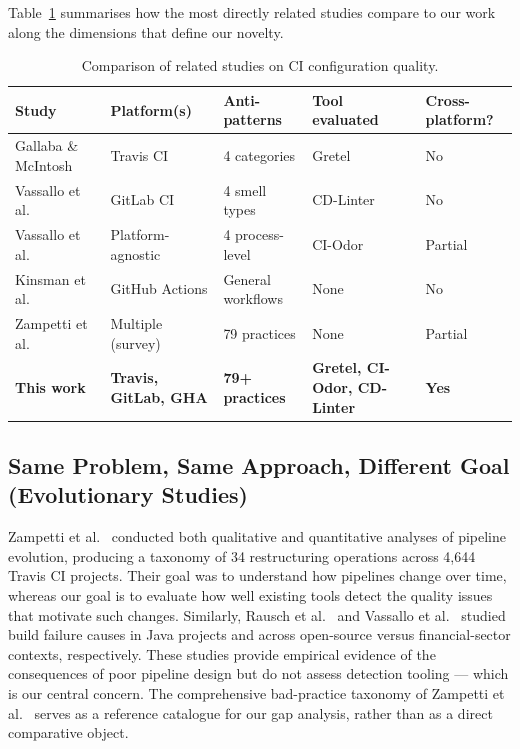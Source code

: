 \documentclass[12pt, a4paper]{article}
\begin{document}
Table~\ref{tab:related} summarises how the most directly related studies compare to
our work along the dimensions that define our novelty.

\begin{table}[h]
\centering
\caption{Comparison of related studies on CI configuration quality.}
\label{tab:related}
\footnotesize
\begin{tabular}{p{3.2cm}p{2.8cm}p{2.4cm}p{3.6cm}p{1.4cm}}
\toprule
\textbf{Study} & \textbf{Platform(s)} & \textbf{Anti-patterns} & \textbf{Tool evaluated} & \textbf{Cross-platform?} \\
\midrule
Gallaba \& McIntosh~\cite{gallaba2020}   & Travis CI         & 4 categories    & Gretel                    & No      \\
Vassallo et al.~\cite{vassallo2020b}     & GitLab CI         & 4 smell types   & CD-Linter                 & No      \\
Vassallo et al.~\cite{vassallo2019}      & Platform-agnostic & 4 process-level & CI-Odor                   & Partial \\
Kinsman et al.~\cite{kinsman2021}        & GitHub Actions    & General workflows & None                    & No      \\
Zampetti et al.~\cite{zampetti2020}      & Multiple (survey) & 79 practices    & None                      & Partial \\
\textbf{This work}                       & \textbf{Travis, GitLab, GHA} & \textbf{79+ practices} & \textbf{Gretel, CI-Odor, CD-Linter} & \textbf{Yes} \\
\bottomrule
\end{tabular}
\end{table}

\subsection{Same Problem, Same Approach, Different Goal (Evolutionary Studies)}

Zampetti et al.~\cite{zampetti2021} conducted both qualitative and quantitative
analyses of pipeline evolution, producing a taxonomy of 34 restructuring operations
across 4,644 Travis CI projects. Their goal was to understand how pipelines change
over time, whereas our goal is to evaluate how well existing tools detect the quality
issues that motivate such changes. Similarly, Rausch et al.~\cite{rausch2017} and
Vassallo et al.~\cite{vassallo2017} studied build failure causes in Java projects
and across open-source versus financial-sector contexts, respectively. These studies
provide empirical evidence of the consequences of poor pipeline design but do not
assess detection tooling --- which is our central concern. The comprehensive bad-practice
taxonomy of Zampetti et al.~\cite{zampetti2020} serves as a reference catalogue for
our gap analysis, rather than as a direct comparative object.
\end{document}
